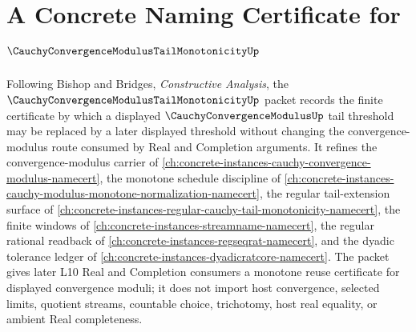 \chapter{A Concrete Naming Certificate for $\CauchyConvergenceModulusTailMonotonicityUp$}
\label{ch:concrete-instances-cauchy-convergence-modulus-tail-monotonicity-namecert}

Following Bishop and Bridges, \emph{Constructive Analysis}, the $\CauchyConvergenceModulusTailMonotonicityUp$ packet records the finite certificate by which a displayed $\CauchyConvergenceModulusUp$ tail threshold may be replaced by a later displayed threshold without changing the convergence-modulus route consumed by Real and Completion arguments. It refines the convergence-modulus carrier of \autoref{ch:concrete-instances-cauchy-convergence-modulus-namecert}, the monotone schedule discipline of \autoref{ch:concrete-instances-cauchy-modulus-monotone-normalization-namecert}, the regular tail-extension surface of \autoref{ch:concrete-instances-regular-cauchy-tail-monotonicity-namecert}, the finite windows of \autoref{ch:concrete-instances-streamname-namecert}, the regular rational readback of \autoref{ch:concrete-instances-regseqrat-namecert}, and the dyadic tolerance ledger of \autoref{ch:concrete-instances-dyadicratcore-namecert}. The packet gives later L10 Real and Completion consumers a monotone reuse certificate for displayed convergence moduli; it does not import host convergence, selected limits, quotient streams, countable choice, trichotomy, host real equality, or ambient Real completeness.

